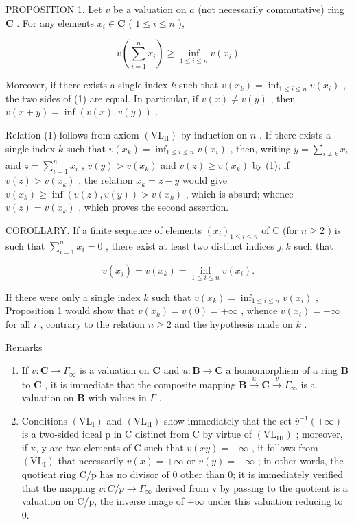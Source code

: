 PROPOSITION 1. Let \(v\) be a valuation on \(a\) (not necessarily commutative) ring \(\mathbf{C}\) . For any elements \(x_{i} \in \mathbf{C}\) ( \(1 \leqslant i \leqslant n\) ),

\[
v \left(\sum_ {i = 1} ^ {n} x _ {i}\right) \geqslant \inf _ {1 \leqslant i \leqslant n} v (x _ {i})\tag{1}
\]

Moreover, if there exists a single index \(k\) such that \(v(x_k) = \inf_{1 \leqslant i \leqslant n} v(x_i)\) , the two sides of (1) are equal. In particular, if \(v(x) \neq v(y)\) , then \(v(x + y) = \inf(v(x), v(y))\) .

Relation (1) follows from axiom \((\mathrm{VL}_{\mathrm{II}})\) by induction on \(n\) . If there exists a single index \(k\) such that \(v(x_k) = \inf_{1 \leqslant i \leqslant n} v(x_i)\) , then, writing \(y = \sum_{i \neq k} x_i\) and \(z = \sum_{i=1}^{n} x_i\) , \(v(y) > v(x_k)\) and \(v(z) \geqslant v(x_k)\) by (1); if \(v(z) > v(x_k)\) , the relation \(x_k = z - y\) would give \(v(x_k) \geqslant \inf(v(z), v(y)) > v(x_k)\) , which is absurd; whence \(v(z) = v(x_k)\) , which proves the second assertion.

COROLLARY. If a finite sequence of elements \((x_{i})_{1\leqslant i\leqslant n}\) of C (for \(n\geqslant 2\) ) is such that \(\sum_{i = 1}^{n}x_{i} = 0\) , there exist at least two distinct indices \(j,k\) such that

\[
v (x _ {j}) = v (x _ {k}) = \inf _ {1 \leqslant i \leqslant n} v (x _ {i}).
\]

If there were only a single index \(k\) such that \(v(x_k) = \inf_{1 \leqslant i \leqslant n} v(x_i)\) , Proposition 1 would show that \(v(x_k) = v(0) = +\infty\) , whence \(v(x_i) = +\infty\) for all \(i\) , contrary to the relation \(n \geqslant 2\) and the hypothesis made on \(k\) .

Remarks

\begin{enumerate}
\def\labelenumi{(\arabic{enumi})}
\item
  If \(v: \mathbf{C} \to \Gamma_{\infty}\) is a valuation on \(\mathbf{C}\) and \(u: \mathbf{B} \to \mathbf{C}\) a homomorphism of a ring \(\mathbf{B}\) to \(\mathbf{C}\) , it is immediate that the composite mapping \(\mathbf{B} \xrightarrow{u} \mathbf{C} \xrightarrow{v} \Gamma_{\infty}\) is a valuation on \(\mathbf{B}\) with values in \(\Gamma\) .
\item
  Conditions \((\mathrm{VL}_{\mathrm{I}})\) and \((\mathrm{VL}_{\mathrm{II}})\) show immediately that the set \(\overline{v}^{-1}(+\infty)\) is a two-sided ideal p in C distinct from C by virtue of \((\mathrm{VL}_{\mathrm{III}})\) ; moreover, if x, y are two elements of C such that \(v(xy)=+\infty\) , it follows from \((\mathrm{VL}_{\mathrm{I}})\) that necessarily \(v(x)=+\infty\) or \(v(y)=+\infty\) ; in other words, the quotient ring C/p has no divisor of 0 other than 0; it is immediately verified that the mapping \(\overline{v}:C/p\to\Gamma_{\infty}\) derived from v by passing to the quotient is a valuation on C/p, the inverse image of \(+\infty\) under this valuation reducing to 0.
\end{enumerate}

